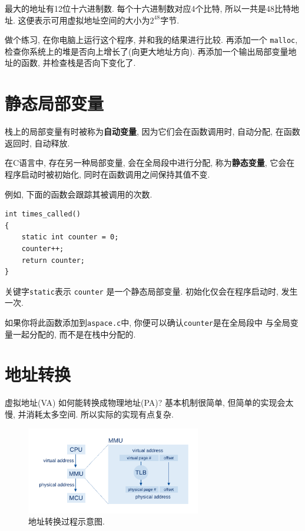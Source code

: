 \documentclass[12pt]{book}
\begin{document}
{最大的地址有12位十六进制数. 每个十六进制数对应4个比特,
所以一共是48比特地址. 这便表示可用虚拟地址空间的大小为$2^{48}$字节.

做个练习, 在你电脑上运行这个程序, 并和我的结果进行比较.
再添加一个 {\tt malloc}, 检查你系统上的堆是否向上增长了(向更大地址方向).
再添加一个输出局部变量地址的函数, 并检查栈是否向下变化了.


\section{静态局部变量}

栈上的局部变量有时被称为{\bf 自动变量},
因为它们会在函数调用时, 自动分配, 在函数返回时, 自动释放.

在C语言中, 存在另一种局部变量, 会在全局段中进行分配, 称为{\bf 静态变量},
它会在程序启动时被初始化, 同时在函数调用之间保持其值不变.

例如, 下面的函数会跟踪其被调用的次数.

\begin{verbatim}
int times_called()
{
    static int counter = 0;
    counter++;
    return counter;
}
\end{verbatim}

关键字{\tt static}表示 {\tt counter} 是一个静态局部变量.
初始化仅会在程序启动时, 发生一次.

如果你将此函数添加到{\tt aspace.c}中, 你便可以确认{\tt counter}是在全局段中
与全局变量一起分配的, 而不是在栈中分配的.



\section{地址转换}
\label{address_translation}

虚拟地址(VA) 如何能转换成物理地址(PA)?
基本机制很简单, 但简单的实现会太慢, 并消耗太多空间.
所以实际的实现有点复杂.

\begin{figure}
\centerline{\includegraphics[width=3in]{figs/address_translation.pdf}}
\caption{地址转换过程示意图.}
\label{addtrans}
\end{figure}

}
\end{document}
